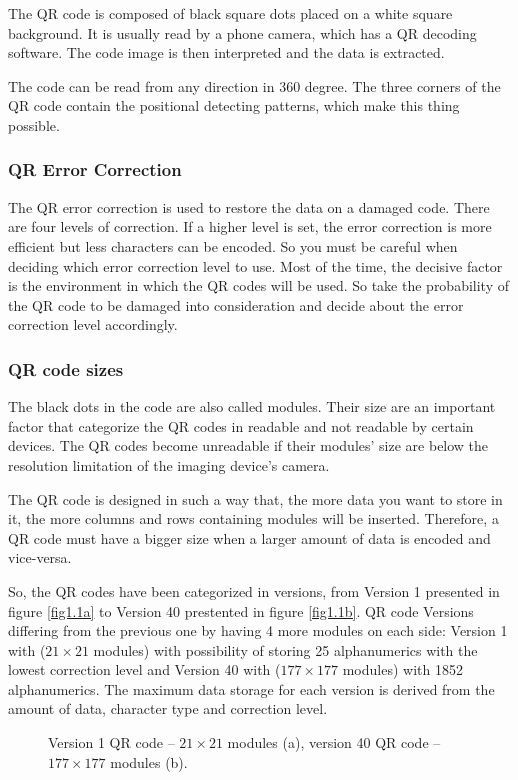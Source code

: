 The QR code is  composed of black square dots placed on a white square background. It is usually read by a phone camera, which has a QR decoding software. The code image is then interpreted and the data is extracted.

The code can be read from any direction in 360 degree. The three corners of the QR code contain the positional detecting patterns, which make this thing possible.

\subsubsection{QR Error Correction}
The QR error correction is used to restore the data on a damaged code. There are four levels of correction. If a higher level is set, the error correction is more efficient but less characters can be encoded. So you must be careful when deciding which error correction level to use. Most of the time, the decisive factor is the environment in which the QR codes will be used. So take the probability of the QR code to be damaged into consideration and decide about the error correction level accordingly.

\subsubsection{QR code sizes}
The black dots in the code are also called modules. Their size are an important factor that categorize the QR codes in readable and not readable by certain devices. The QR codes become unreadable if their modules’ size are below the resolution limitation of the imaging device’s camera.

The QR code is designed in such a way that, the more data you want to store in it, the more columns and rows containing modules will be inserted. Therefore, a QR code must have a bigger size when a larger amount of data is encoded and vice-versa.

So, the QR codes have been categorized in versions, from Version 1 presented in figure \ref{fig1.1a} to Version 40 prestented in figure \ref{fig1.1b}.  QR code Versions differing from the previous one by having 4 more modules on each side: Version 1 with ($21 \times 21$ modules) with possibility of storing 25 alphanumerics with the lowest correction level and Version 40 with  ($177 \times 177$ modules) with 1852 alphanumerics. The maximum data storage for each version is derived from the amount of data, character type and correction level.


\begin{figure}[!ht]
  \centering
 \hspace{0.09cm}
  \caption{Version 1 QR code -- $21\times21$ modules (a), version 40 QR code -- $177\times177$ modules (b).}
  \label{fig1.1}
\end{figure}

